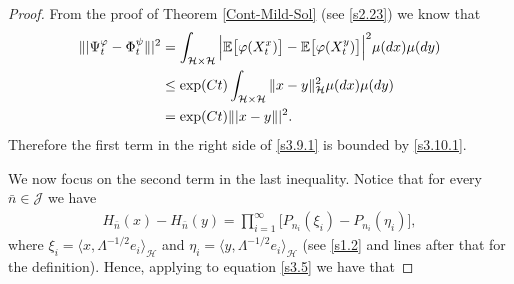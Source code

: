 \documentclass[review, onefignum, onetabnum]{siamart171218}
\begin{document}
\begin{proof}
From the proof of Theorem \ref{Cont-Mild-Sol} (see \eqref{s2.23}) we know that
\begin{equation}
    \begin{aligned}
        \| | \Psi_t^\varphi-\Phi_t^\psi\| |^2
            &=\int_{\mathcal{H}\times \mathcal{H}}
            \Big|
                \E\big [
                    \varphi(X_t^x)
                \big]
                -
                \E\big[
                    \varphi(X_t^y)
                \big]
            \Big|^2
            \mu(dx)
            \mu(dy)
            \\
            &\le
            \exp(Ct)
            \int_{\mathcal{H}\times \mathcal{H}}
                \|x-y\|_{\mathcal{H}}^2
                \mu(dx)\mu(dy)
            \\
            &= \exp(Ct) \|  |x-y\| |^2.\label{s3.10.1}
    \end{aligned}
\end{equation}
Therefore the first term in the right side of \eqref{s3.9.1} is bounded by
\eqref{s3.10.1}.

We now focus on the second term in the last inequality. Notice that for every
$\bar n\in \mathcal{J}$ we have
\begin{align}\label{s3.5}
    H_{\bar n}(x) - H_{\bar n}(y) =
        \prod_{i = 1} ^ \infty
    \Big[
        P_{n_i}( \xi_i ) - P_{n_i} (\eta_i)
    \Big],
\end{align}
where $\xi_i= \langle x,\Lambda^{-1/2}e_i\rangle_{\mathcal{H}}$ and $\eta_i=
\langle y,\Lambda^{-1/2}e_i\rangle_{\mathcal{H}}$
(see \eqref{s1.2} and lines after that for the definition).
Hence, applying  to equation \eqref{s3.5} we have that


\end{proof}
\end{document}
